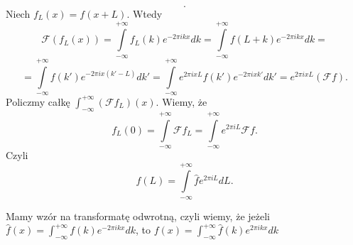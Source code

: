 \documentclass[../main.tex]{subfiles}
\begin{document}
\begin{enumerate}
\[.\]
Niech $f_L(x) = f(x+L)$. Wtedy
 \[
     \mathcal{F}\left( f_L(x) \right) = \int\limits_{-\infty}^{+\infty}f_L(k) e^{-2\pi i k x}dk = \int\limits_{-\infty}^{+\infty}f(L+k)e^{-2\pi ikx}dk =
\]
\[
    = \int\limits_{-\infty}^{+\infty}f(k') e^{-2\pi i x(k' - L)}dk' = \int\limits_{-\infty}^{+\infty}e^{2\pi ix L}f(k')e^{-2\pi ixk'}dk' = e^{2\pi ixL}\left( \mathcal{F}f \right)
.\]
Policzmy całkę $\int_{-\infty}^{+\infty}(\mathcal{F}f_L)(x)$. Wiemy, że
\[
    f_L(0) = \int\limits_{-\infty}^{+\infty}\mathcal{F}f_L = \int\limits_{-\infty}^{+\infty}e^{2\pi i L}\mathcal{F}f
.\]
Czyli
\[
    f(L) = \int\limits_{-\infty}^{+\infty}\hat{f}e^{2\pi i L}dL
.\]
\end{enumerate}
Mamy wzór na transformatę odwrotną, czyli wiemy, że jeżeli $\hat{f}(x) = \int_{-\infty}^{+\infty}f(k)e^{-2\pi i kx}dk$, to $f(x) = \int_{-\infty}^{+\infty}\hat{f}(k) e^{2\pi i kx}dk$
\end{document}

